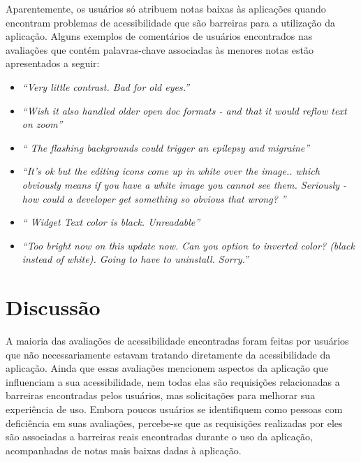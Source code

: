 Aparentemente, os usuários só atribuem notas baixas às aplicações quando encontram problemas de acessibilidade que são barreiras para a utilização da aplicação. 
Alguns exemplos de comentários de usuários encontrados nas avaliações que contém palavras-chave associadas às menores notas estão apresentados a seguir:
\begin{itemize}
 \item \textit{``Very little contrast. Bad for old eyes.''}
 \item \textit{``Wish it also handled older open doc formats - and that it would reflow text on zoom''}
 \item \textit{`` The flashing backgrounds could trigger an epilepsy and migraine''}
 \item \textit{``It's ok but the editing icons come up in white over the image.. which obviously means if you have a white image you cannot see them. Seriously - how could a developer get something so obvious that wrong? ''}
 \item \textit{`` Widget Text color is black. Unreadable''}
 \item \textit{``Too bright now on this update now. Can you option to inverted color? (black instead of white). Going to have to uninstall. Sorry.''}  
\end{itemize}



\section{Discussão}

A maioria das avaliações de acessibilidade encontradas foram feitas por usuários que não necessariamente estavam tratando diretamente da acessibilidade da aplicação. Ainda que essas avaliações mencionem aspectos da aplicação que influenciam a sua acessibilidade, nem todas elas são requisições relacionadas a barreiras encontradas pelos usuários, mas solicitações para melhorar sua experiência de uso. 
Embora poucos usuários se identifiquem como pessoas com deficiência em suas avaliações, percebe-se que as requisições realizadas por eles são associadas a barreiras reais encontradas durante o uso da aplicação, acompanhadas de notas mais baixas dadas à aplicação. 


